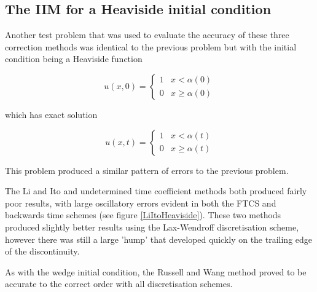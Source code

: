 \subsection{The IIM for a Heaviside initial condition}

Another test problem that was used to evaluate the accuracy of these three correction methods was identical to the previous problem but with the initial condition being a Heaviside function

\begin{equation}
    u(x,0) = \begin{cases}
        1 & x < \alpha(0) \\
        0 & x \geq \alpha(0)
    \end{cases}
\end{equation}

which has exact solution

\begin{equation}
    u(x,t) = \begin{cases}
        1 & x < \alpha(t) \\
        0 & x \geq \alpha(t)
    \end{cases}
\end{equation}

This problem produced a similar pattern of errors to the previous problem.

The Li and Ito and undetermined time coefficient methods both produced fairly poor results, with large oscillatory errors evident in both the FTCS and backwards time schemes (see figure \ref{LiItoHeaviside}).
These two methods produced slightly better results using the Lax-Wendroff discretisation scheme, however there was still a large 'hump' that developed quickly on the trailing edge of the discontinuity.

As with the wedge initial condition, the Russell and Wang method proved to be accurate to the correct order with all discretisation schemes.


